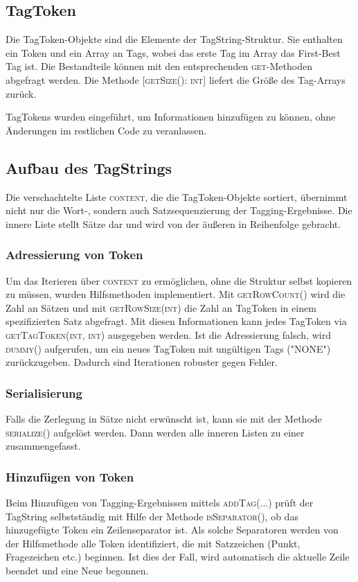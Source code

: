 \subsection{TagToken}
Die TagToken-Objekte sind die Elemente der TagString-Struktur. Sie enthalten ein Token und ein Array an Tags, wobei das erste Tag im Array das First-Best Tag ist. Die Bestandteile können mit den entsprechenden \textsc{get}-Methoden abgefragt werden. Die Methode \textsc{[getSize(): int]} liefert die Größe des Tag-Arrays zurück.

TagTokens wurden eingeführt, um Informationen hinzufügen zu können, ohne Änderungen im restlichen Code zu veranlassen.
\subsection{Aufbau des TagStrings}

Die verschachtelte Liste \textsc{content}, die die TagToken-Objekte sortiert, übernimmt nicht nur die Wort-, sondern auch Satzsequenzierung der Tagging-Ergebnisse. Die innere Liste stellt Sätze dar und wird von der äußeren in Reihenfolge gebracht. 

\subsubsection{Adressierung von Token}
Um das Iterieren über \textsc{content} zu ermöglichen, ohne die Struktur selbst kopieren zu müssen, wurden Hilfsmethoden implementiert. Mit \textsc{getRowCount()} wird die Zahl an Sätzen und mit \textsc{getRowSize(int)} die Zahl an TagToken in einem spezifizierten Satz abgefragt. Mit diesen Informationen kann jedes TagToken via \textsc{getTagToken(int, int)} ausgegeben werden. Ist die Adressierung falsch, wird \textsc{dummy()} aufgerufen, um ein neues TagToken mit ungültigen Tags ("NONE") zurückzugeben. Dadurch sind Iterationen robuster gegen Fehler.

\subsubsection{Serialisierung}
Falls die Zerlegung in Sätze nicht erwünscht ist, kann sie mit der Methode \textsc{serialize()} aufgelöst werden. Dann werden alle inneren Listen zu einer zusammengefasst.

\subsubsection{Hinzufügen von Token}
Beim Hinzufügen von Tagging-Ergebnissen mittels \textsc{addTag(...)} prüft der TagString selbstständig mit Hilfe der Methode \textsc{isSeparator()}, ob das hinzugefügte Token ein Zeilenseparator ist. Als solche Separatoren werden von der Hilfsmethode alle Token identifiziert, die mit Satzzeichen (Punkt, Fragezeichen etc.) beginnen. Ist dies der Fall, wird automatisch die aktuelle Zeile beendet und eine Neue begonnen. 

